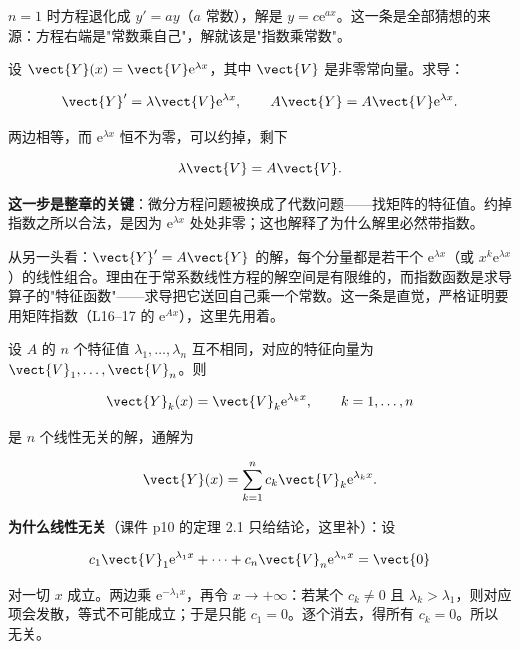 \documentclass[11pt]{ctexart}
\begin{document}


$n=1$ 时方程退化成 $y'=ay$（$a$ 常数），解是 $y=c\mathrm{e}^{ax}$。这一条是全部猜想的来源：方程右端是"常数乘自己"，解就该是"指数乘常数"。


设 $\vect{Y}(x)=\vect{V}\mathrm{e}^{\lambda x}$，其中 $\vect{V}$ 是非零常向量。求导：

\[
\vect{Y}'=\lambda\vect{V}\mathrm{e}^{\lambda x},\qquad
A\vect{Y}=A\vect{V}\mathrm{e}^{\lambda x}.
\]

两边相等，而 $\mathrm{e}^{\lambda x}$ 恒不为零，可以约掉，剩下

\[
\lambda\vect{V}=A\vect{V}.
\]

\textbf{这一步是整章的关键}：微分方程问题被换成了代数问题——找矩阵的特征值。约掉指数之所以合法，是因为 $\mathrm{e}^{\lambda x}$ 处处非零；这也解释了为什么解里必然带指数。


从另一头看：$\vect{Y}'=A\vect{Y}$ 的解，每个分量都是若干个 $\mathrm{e}^{\lambda x}$（或 $x^k\mathrm{e}^{\lambda x}$）的线性组合。理由在于常系数线性方程的解空间是有限维的，而指数函数是求导算子的"特征函数"——求导把它送回自己乘一个常数。这一条是直觉，严格证明要用矩阵指数（L16--17 的 $\mathrm{e}^{Ax}$），这里先用着。



设 $A$ 的 $n$ 个特征值 $\lambda_1,\dots,\lambda_n$ 互不相同，对应的特征向量为 $\vect{V}_1,\dots,\vect{V}_n$。则

\[
\vect{Y}_k(x)=\vect{V}_k\mathrm{e}^{\lambda_k x},\qquad k=1,\dots,n
\]

是 $n$ 个线性无关的解，通解为

\[
\vect{Y}(x)=\sum_{k=1}^{n}c_k\vect{V}_k\mathrm{e}^{\lambda_k x}.
\]

\textbf{为什么线性无关}（课件 p10 的定理 2.1 只给结论，这里补）：设

\[
c_1\vect{V}_1\mathrm{e}^{\lambda_1x}+\cdots+c_n\vect{V}_n\mathrm{e}^{\lambda_nx}=\vect{0}
\]

对一切 $x$ 成立。两边乘 $\mathrm{e}^{-\lambda_1x}$，再令 $x\to+\infty$：若某个 $c_k\neq0$ 且 $\lambda_k>\lambda_1$，则对应项会发散，等式不可能成立；于是只能 $c_1=0$。逐个消去，得所有 $c_k=0$。所以无关。
\end{document}
